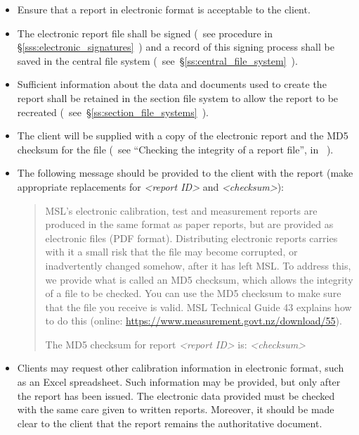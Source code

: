 \begin{itemize}

\item Ensure that a report in electronic format is acceptable to the client.

\item The electronic report file shall be signed (~see procedure in \S\ref{sss:electronic_signatures}~) and a record of this signing process shall be saved in the central file system (~see~\S\ref{ss:central_file_system}~). 

\item Sufficient information about the data and documents used to create the report shall be retained in the section file system to allow the report to be recreated (~see~\S\ref{ss:section_file_systems}~). 
   
\item The client will be supplied with a copy of the electronic report and the MD5 checksum for the file (~see ``Checking the integrity of a report file'', in \cite[\S\ref*{GRP-ss:file_integrity_md5}]{MSL_Reporting_Guidelines}~).

\item The following message should be provided to the client with the report (make appropriate replacements for \textit{<report ID>} and  \textit{<checksum>}):
\begin{quote}
MSL's electronic calibration, test and measurement reports are produced in the same format as paper reports, but are provided as electronic files (PDF format). Distributing electronic reports carries with it a small risk that the file may become corrupted, or inadvertently changed somehow, after it has left MSL. To address this, we provide what is called an MD5 checksum, which allows the integrity of a file to be checked. You can use the MD5 checksum to make sure that the file you receive is valid. MSL Technical Guide 43 explains how to do this (online: \url{https://www.measurement.govt.nz/download/55}).

\vspace{\baselineskip}
The MD5 checksum for report \textit{<report ID>} is:   \textit{<checksum>} 
\end{quote}

\item Clients may request other calibration information in electronic format, such as an Excel spreadsheet. Such information may be provided, but only after the report has been issued. The electronic data provided must be checked with the same care given to written reports. Moreover, it should be made clear to the client that the report remains the authoritative document. 

\end{itemize}



